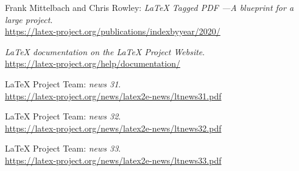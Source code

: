 \documentclass{ltnews}
\providecommand\Dash {\unskip ---}
\begin{document}
\begin{thebibliography}{9}

\fontsize{9.3}{11.3}\selectfont

 Frank Mittelbach and Chris Rowley:
  \emph{\LaTeX{} Tagged PDF \Dash A blueprint for a large project}.\\
  \url{https://latex-project.org/publications/indexbyyear/2020/}

  \emph{\LaTeX{} documentation on the \LaTeX{} Project Website}.\\
  \url{https://latex-project.org/help/documentation/}

 \LaTeX{} Project Team:
  \emph{\LaTeXe{} news 31}.\\
  \url{https://latex-project.org/news/latex2e-news/ltnews31.pdf}

 \LaTeX{} Project Team:
  \emph{\LaTeXe{} news 32}.\\
  \url{https://latex-project.org/news/latex2e-news/ltnews32.pdf}

 \LaTeX{} Project Team:
  \emph{\LaTeXe{} news 33}.\\
  \url{https://latex-project.org/news/latex2e-news/ltnews33.pdf}

\end{thebibliography}
\end{document}

